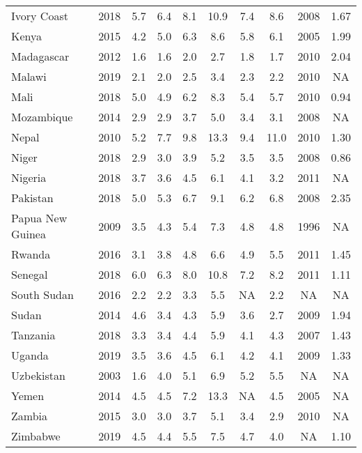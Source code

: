 \begin{table}[b]
{\begin{tabular}[t]{lccccccccc}
Ivory Coast & 2018 & 5.7 & 6.4 & 8.1 & 10.9 & 7.4 & 8.6 & 2008 & 1.67\\
Kenya & 2015 & 4.2 & 5.0 & 6.3 & 8.6 & 5.8 & 6.1 & 2005 & 1.99\\
Madagascar & 2012 & 1.6 & 1.6 & 2.0 & 2.7 & 1.8 & 1.7 & 2010 & 2.04\\
Malawi & 2019 & 2.1 & 2.0 & 2.5 & 3.4 & 2.3 & 2.2 & 2010 & NA\\
Mali & 2018 & 5.0 & 4.9 & 6.2 & 8.3 & 5.4 & 5.7 & 2010 & 0.94\\
Mozambique & 2014 & 2.9 & 2.9 & 3.7 & 5.0 & 3.4 & 3.1 & 2008 & NA\\
Nepal & 2010 & 5.2 & 7.7 & 9.8 & 13.3 & 9.4 & 11.0 & 2010 & 1.30\\
Niger & 2018 & 2.9 & 3.0 & 3.9 & 5.2 & 3.5 & 3.5 & 2008 & 0.86\\
Nigeria & 2018 & 3.7 & 3.6 & 4.5 & 6.1 & 4.1 & 3.2 & 2011 & NA\\
Pakistan & 2018 & 5.0 & 5.3 & 6.7 & 9.1 & 6.2 & 6.8 & 2008 & 2.35\\
Papua New Guinea & 2009 & 3.5 & 4.3 & 5.4 & 7.3 & 4.8 & 4.8 & 1996 & NA\\
Rwanda & 2016 & 3.1 & 3.8 & 4.8 & 6.6 & 4.9 & 5.5 & 2011 & 1.45\\
Senegal & 2018 & 6.0 & 6.3 & 8.0 & 10.8 & 7.2 & 8.2 & 2011 & 1.11\\
South Sudan & 2016 & 2.2 & 2.2 & 3.3 & 5.5 & NA & 2.2 & NA & NA\\
Sudan & 2014 & 4.6 & 3.4 & 4.3 & 5.9 & 3.6 & 2.7 & 2009 & 1.94\\
Tanzania & 2018 & 3.3 & 3.4 & 4.4 & 5.9 & 4.1 & 4.3 & 2007 & 1.43\\
Uganda & 2019 & 3.5 & 3.6 & 4.5 & 6.1 & 4.2 & 4.1 & 2009 & 1.33\\
Uzbekistan & 2003 & 1.6 & 4.0 & 5.1 & 6.9 & 5.2 & 5.5 & NA & NA\\
Yemen & 2014 & 4.5 & 4.5 & 7.2 & 13.3 & NA & 4.5 & 2005 & NA\\
Zambia & 2015 & 3.0 & 3.0 & 3.7 & 5.1 & 3.4 & 2.9 & 2010 & NA\\
Zimbabwe & 2019 & 4.5 & 4.4 & 5.5 & 7.5 & 4.7 & 4.0 & NA & 1.10\\
\bottomrule
\end{tabular}}
\end{table}